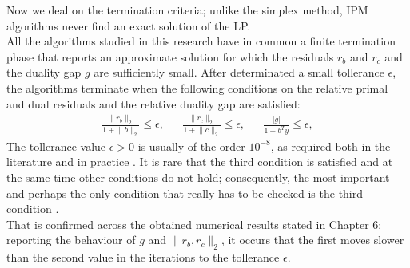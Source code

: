 \documentclass[a4paper,10 pt,titlepage,twoside]{book}
\theoremstyle{plain}
\theoremstyle{definition}
\theoremstyle{remark}
\begin{document}
\newpage
Now we deal on the termination criteria; unlike the simplex method, IPM algorithms never find an exact solution of the LP.\\ All the algorithms studied in this research have in common a finite termination phase that reports an approximate solution for which the residuals $r_{b}$ and $r_{c}$ and the duality gap $g$ are sufficiently small. After determinated a small tollerance $\epsilon$, the algorithms terminate when the following conditions on the relative primal and dual residuals and the relative duality gap are satisfied:
\begin{align}\label{TermC}
\frac{\lVert r_{b}\rVert_{2}}{1+ \lVert b \rVert_{2}}\leq \epsilon, && \frac{\lVert r_{c}\rVert_{2}}{1 + \lVert c \rVert_{2}}\leq \epsilon, &&\frac{|g|}{1+b^{T}y}\leq \epsilon,
\end{align}
The tollerance value $\epsilon > 0$ is usually of the order $10^{-8}$, as required both in the literature and in practice \cite{Wright}. It is rare that the third condition is satisfied and at the same time
other conditions do not hold; consequently, the most important and perhaps
the only condition that really has to be checked is the third condition \cite{ADL}.\\
That is confirmed across the obtained numerical results stated in Chapter 6: reporting the behaviour of $g$ and $\lVert r_{b},r_{c}\rVert_{2}$, it occurs that the first moves slower than the second value in the iterations to the tollerance $\epsilon$.\\
\end{document}
